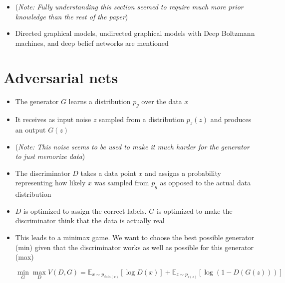 \documentclass{article}
\begin{document}
\begin{itemize}
    \item (\emph{Note: Fully understanding this section seemed to require much more prior knowledge than the rest of the paper})
    \item Directed graphical models, undirected graphical models with Deep Boltzmann machines, and deep belief networks are mentioned
\end{itemize}

\section{Adversarial nets}

\begin{itemize}
    \item The generator $G$ learns a distribution $p_g$ over the data $x$
    \item It receives as input noise $z$ sampled from a distribution $p_z(z)$ and produces an output $G(z)$
    \item (\emph{Note: This noise seems to be used to make it much harder for the generator to just memorize data})
    \item The discriminator $D$ takes a data point $x$ and assigns a probability representing how likely $x$ was sampled from $p_g$ as opposed to the actual data distribution
    \item $D$ is optimized to assign the correct labels. $G$ is optimized to make the discriminator think that the data is actually real
    \item This leads to a minimax game. We want to choose the best possible generator (min) given that the discriminator works as well as possible for this generator (max)

    \[
    \min\limits_{G} \max\limits_{D} V(D, G) = \mathds{E}_{x \sim p_{\mathit{data}(x)}}[\log D(x)] + \mathds{E}_{z \sim p_{\mathit{z}(z)}}[\log (1 - D(G(z)))]
    \]


\end{itemize}
\end{document}
